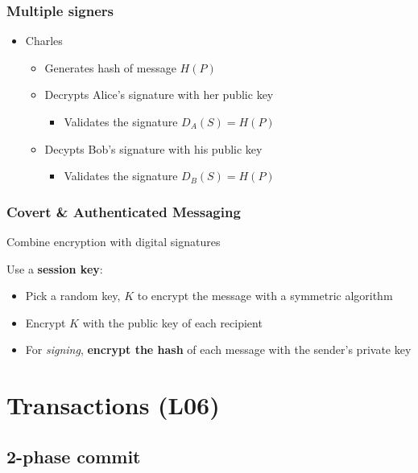 \documentclass{easyclass}
\begin{document}
    \subsection{Multiple signers}
    \begin{itemize}
        \item Charles
        \begin{itemize}
            \item Generates hash of message $H(P)$
            \item Decrypts Alice's signature with her public key
            \begin{itemize}
                \item Validates the signature $D_A(S) = H(P)$
            \end{itemize}
            \item Decypts Bob's signature with his public key
            \begin{itemize}
                \item Validates the signature $D_B(S) = H(P)$
            \end{itemize}
        \end{itemize}
    \end{itemize}

    \subsection{Covert \& Authenticated Messaging}
    Combine encryption with digital signatures

    \begin{theo}{}
        Use a \textbf{session key}:
        \begin{itemize}
            \item Pick a random key, $K$ to encrypt the message with a symmetric algorithm
            \item Encrypt $K$ with the public key of each recipient
            \item For \emph{signing}, \textbf{encrypt the hash} of each message with
            the sender's private key
        \end{itemize}
    \end{theo}


\chapter{Transactions (L06)}
\section{2-phase commit}
\end{document}
